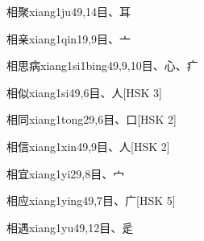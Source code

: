 \begin{EntryWithPhonetic}{相聚}{xiang1ju4}{9,14}{⽬、⽿}
\end{EntryWithPhonetic}

\begin{EntryWithPhonetic}{相亲}{xiang1qin1}{9,9}{⽬、⼇}
\end{EntryWithPhonetic}

\begin{EntryWithPhonetic}{相思病}{xiang1si1bing4}{9,9,10}{⽬、⼼、⽧}
\end{EntryWithPhonetic}

\begin{EntryWithPhonetic}{相似}{xiang1si4}{9,6}{⽬、⼈}[HSK 3]
\end{EntryWithPhonetic}

\begin{EntryWithPhonetic}{相同}{xiang1tong2}{9,6}{⽬、⼝}[HSK 2]
\end{EntryWithPhonetic}

\begin{EntryWithPhonetic}{相信}{xiang1xin4}{9,9}{⽬、⼈}[HSK 2]
\end{EntryWithPhonetic}

\begin{EntryWithPhonetic}{相宜}{xiang1yi2}{9,8}{⽬、⼧}
\end{EntryWithPhonetic}

\begin{EntryWithPhonetic}{相应}{xiang1ying4}{9,7}{⽬、⼴}[HSK 5]
\end{EntryWithPhonetic}

\begin{EntryWithPhonetic}{相遇}{xiang1yu4}{9,12}{⽬、⾡}
\end{EntryWithPhonetic}


